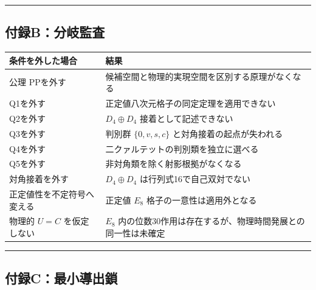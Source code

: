 \documentclass[
  a4paper,
  ja=minimal,
  xelatex,
  paragraph-mark={},
]{bxjsarticle}
\newcounter{none} %
\begin{document}
\begin{center}\rule{0.5\linewidth}{0.5pt}\end{center}

\subsection{付録B：分岐監査}\label{ux4ed8ux9332bux5206ux5c90ux76e3ux67fb}

{\def\LTcaptype{none} %
\begin{longtable}[]{@{}
  >{\raggedright\arraybackslash}p{}
  >{\raggedright\arraybackslash}p{}@{}}
\toprule\noalign{}
\begin{minipage}[b]{\linewidth}\raggedright
条件を外した場合
\end{minipage} & \begin{minipage}[b]{\linewidth}\raggedright
結果
\end{minipage} \\
\midrule\noalign{}
\endhead
\bottomrule\noalign{}
\endlastfoot
公理 PPを外す & 候補空間と物理的実現空間を区別する原理がなくなる \\
Q1を外す & 正定値八次元格子の同定定理を適用できない \\
Q2を外す & \(D_4\oplus D_4\) 接着として記述できない \\
Q3を外す & 判別群 \(\{0,v,s,c\}\) と対角接着の起点が失われる \\
Q4を外す & 二クァルテットの判別類を独立に選べる \\
Q5を外す & 非対角類を除く射影根拠がなくなる \\
対角接着を外す & \(D_4\oplus D_4\) は行列式16で自己双対でない \\
正定値性を不定符号へ変える & 正定値 \(E_8\)
格子の一意性は適用外となる \\
物理的 \(U=C\) を仮定しない & \(E_8\)
内の位数30作用は存在するが、物理時間発展との同一性は未確定 \\
\end{longtable}
}

\begin{center}\rule{0.5\linewidth}{0.5pt}\end{center}

\subsection{付録C：最小導出鎖}\label{ux4ed8ux9332cux6700ux5c0fux5c0eux51faux9396}
\end{document}

